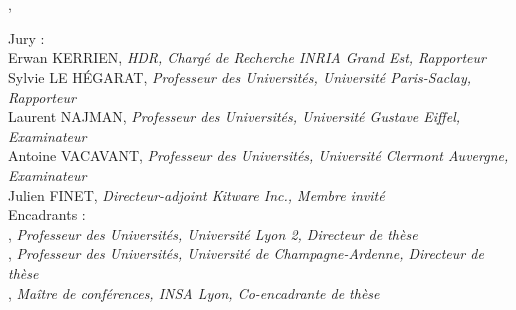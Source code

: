\hfill
\vfill
{
	\small
	\textbf{\thesisName} \\
	\textit{\thesisTitle} \\
	\thesisSubject, \thesisDate \\
	\begin{minipage}[t]{\textwidth}
		{Jury : }\\
		{\small Erwan KERRIEN, \textit{HDR, Chargé de Recherche INRIA Grand Est, Rapporteur}} \\
		{\small Sylvie LE HÉGARAT, \textit{Professeur des Universités, Université Paris-Saclay, Rapporteur}} \\
		{\small Laurent NAJMAN, \textit{Professeur des Universités, Université Gustave Eiffel, Examinateur}} \\
		{\small Antoine VACAVANT, \textit{Professeur des Universités, Université Clermont Auvergne, Examinateur}} \\
        {\small Julien FINET, \textit{Directeur-adjoint Kitware Inc., Membre invité}} \\
		{Encadrants : }\\
		{\small \thesisFirstSupervisor, \textit{Professeur des Universités, Université Lyon 2, Directeur de thèse}} \\
	  	{\small \thesisSecondSupervisor, \textit{Professeur des Universités, Université de Champagne-Ardenne, Directeur de thèse}} \\
		{\small \thesisThirdSupervisor, \textit{Maître de conférences, INSA Lyon, Co-encadrante de thèse}}
	\end{minipage} \\[5mm]
	\textbf{\thesisUniversity} \\
	\thesisUniversityInstitute \\
	\thesisUniversityStreetAddress \\
	\thesisUniversityPostalCode\ \thesisUniversityCity
}
